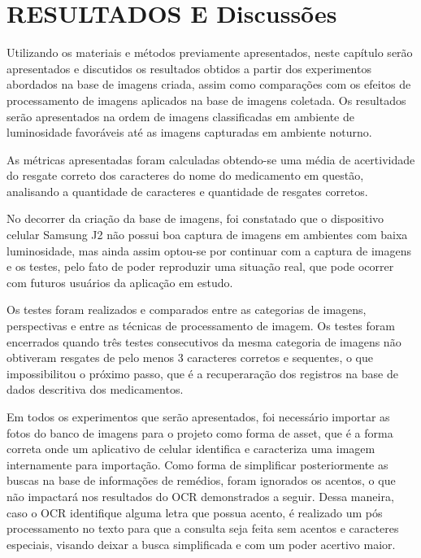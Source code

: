 \chapter{RESULTADOS E Discussões}\label{ch:intro}
Utilizando os materiais e métodos previamente apresentados, neste capítulo serão
apresentados e discutidos os resultados obtidos a partir dos experimentos abordados na base de imagens criada, assim como comparações com os efeitos de processamento de imagens aplicados na base de imagens coletada. Os resultados serão apresentados na ordem de imagens classificadas em ambiente de luminosidade favoráveis até as imagens capturadas em ambiente noturno.


As métricas apresentadas foram calculadas obtendo-se uma média de acertividade do resgate correto dos caracteres do nome do medicamento em questão, analisando a quantidade de caracteres e quantidade de resgates corretos.

 No decorrer da criação da base de imagens, foi constatado que o dispositivo celular Samsung J2  não possui boa captura de imagens em ambientes com baixa luminosidade, mas ainda assim optou-se por continuar com a captura de imagens e os testes, pelo fato de poder reproduzir uma situação real, que pode ocorrer com futuros usuários da aplicação em estudo.
 
Os testes foram realizados e comparados entre as categorias de imagens, perspectivas e entre as técnicas de processamento de imagem. Os testes foram encerrados quando três testes consecutivos da mesma categoria de imagens não obtiveram resgates de pelo menos 3 caracteres corretos e sequentes, o que impossibilitou o próximo passo, que é a recuperaração dos registros na base de dados descritiva dos medicamentos.

Em todos os experimentos que serão apresentados, foi necessário importar as fotos do banco de imagens para o projeto como forma de asset, que é a forma correta onde um aplicativo de celular identifica e caracteriza uma imagem internamente para importação. Como forma de simplificar posteriormente as buscas na base de informações de remédios, foram ignorados os acentos, o que não impactará nos resultados do OCR demonstrados a seguir. Dessa maneira, caso o OCR identifique alguma letra que possua acento, é realizado um pós processamento no texto para que a consulta seja feita sem acentos e caracteres especiais, visando deixar a busca simplificada e com um poder acertivo maior.

